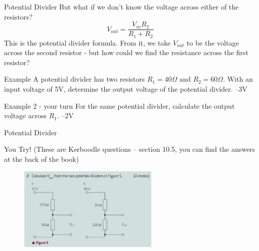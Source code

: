 \documentclass[../Main.tex]{subfiles}
\begin{document}
\begin{frame}{Potential Divider}
    But what if we don't know the voltage across either of the resistors?
    \pause
     \begin{equation*}
        V_{out} = \frac{V_{in}R_2}{R_1+R_2}
    \end{equation*}
    This is the potential divider formula. From it, we take $V_{out}$ to be the voltage across the second resistor - but how could we find the resistance across the first resistor?
  
    \begin{exampleblock}{Example}
    A potential divider has two resistors $R_1=40 \Omega \mbox{ and } R_2=60 \Omega$. With an input voltage of 5V, determine the output voltage of the potential divider. \pause
    --3V
\end{exampleblock} \pause

\begin{exampleblock}{Example 2 - your turn}
    For the same potential divider, calculate the output voltage across $R_1$. \pause
    --2V 
\end{exampleblock}
\end{frame}

\begin{frame}{Potential Divider}
    \begin{exampleblock}{You Try!}
        (These are Kerboodle questions -- section 10.5, you can find the answers at the back of the book)
        
        \begin{figure}
            \centering
            \includegraphics[height=4cm]{Electricity_Images/potential_divider_questions.jpg}
        \end{figure}
    \end{exampleblock}
\end{frame}
\end{document}
